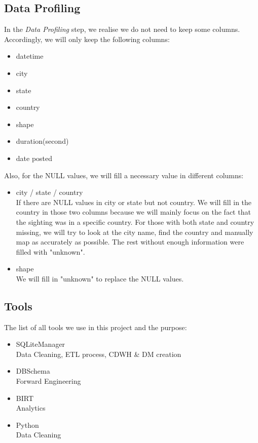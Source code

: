 \documentclass[11pt, journal]{IEEEtran}
\begin{document}
\subsection{Data Profiling}\label{subsec:dataProfiling}
In the \emph{Data Profiling} step, we realise we do not need to keep some columns. Accordingly, we will only keep the following columns:
\begin{itemize}
    \item datetime
    \item city
    \item state
    \item country
    \item shape
    \item duration(second)
    \item date posted
\end{itemize}
Also, for the NULL values, we will fill a necessary value in different columns:
\begin{itemize}
    \item city / state / country\\
    If there are NULL values in city or state but not country. We will fill in the country in those two columns because we will mainly focus on the fact that the sighting was in a specific country. For those with both state and country missing, we will try to look at the city name, find the country and manually map as accurately as possible. The rest without enough information were filled with "unknown".
    \item shape\\
    We will fill in "unknown" to replace the NULL values.
\end{itemize}

\subsection{Tools}\label{subsec:tools}
The list of all tools we use in this project and the purpose:  
\begin{itemize}
    \item SQLiteManager\\
    Data Cleaning, ETL process, CDWH \& DM creation
    \item DBSchema\\
    Forward Engineering
    \item BIRT\\
    Analytics
    \item Python\\
    Data Cleaning
\end{itemize}
    
\end{document}
